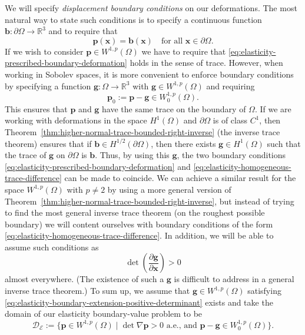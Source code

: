We will specify \emph{displacement boundary conditions} on our deformations. The most natural way to state such conditions is to specify a continuous function $\bm{b}:\partial\Omega\to\mathbb{R}^3$ and to require that
\begin{equation}\label{eq:elasticity-prescribed-boundary-deformation}
\bm{p}(\bm{x})=\bm{b}(\bm{x})\quad\text{for all }\bm{x}\in\partial\Omega.
\end{equation}
If we wish to consider $\bm{p}\in W^{1,p}(\Omega)$ we have to require that \eqref{eq:elasticity-prescribed-boundary-deformation} holds in the sense of trace. However, when working in Sobolev spaces, it is more convenient to enforce boundary conditions by specifying a function $\bm{g}:\Omega\to\mathbb{R}^3$ with $\bm{g}\in W^{1,p}(\Omega)$ and requiring
\begin{equation}\label{eq:elasticity-homogeneous-trace-difference}
\bm{p}_0:=\bm{p}-\bm{g}\in W_0^{1,p}(\Omega).
\end{equation}
This ensures that $\bm{p}$ and $\bm{g}$ have the same trace on the boundary of $\Omega$. If we are working with deformations in the space $H^1(\Omega)$ and $\partial\Omega$ is of class $C^1$, then Theorem~\ref{thm:higher-normal-trace-bounded-right-inverse} (the inverse trace theorem) ensures that if $\bm{b}\in H^{1/2}(\partial\Omega)$, then there exists $\bm{g}\in H^1(\Omega)$ such that the trace of $\bm{g}$ on $\partial\Omega$ is $\bm{b}$. Thus, by using this $\bm{g}$, the two boundary conditions \eqref{eq:elasticity-prescribed-boundary-deformation} and \eqref{eq:elasticity-homogeneous-trace-difference} can be made to coincide. We can achieve a similar result for the space $W^{1,p}(\Omega)$ with $p\neq2$ by using a more general version of Theorem~\ref{thm:higher-normal-trace-bounded-right-inverse}, but instead of trying to find the most general inverse trace theorem (on the roughest possible boundary) we will content ourselves with boundary conditions of the form \eqref{eq:elasticity-homogeneous-trace-difference}. In addition, we will be able to assume such conditions as
\begin{equation}\label{eq:elasticity-boundary-extension-positive-determinant}
\det\left(\dfrac{\partial\bm{g}}{\partial\bm{x}}\right)>0
\end{equation}
almost everywhere. (The existence of such a $\bm{g}$ is difficult to address in a general inverse trace theorem.) To sum up, we assume that $\bm{g}\in W^{1,p}(\Omega)$ satisfying \eqref{eq:elasticity-boundary-extension-positive-determinant} exists and take the domain of our elasticity boundary-value problem to be
\begin{equation}\label{eq:elasticity-admissible-deformation-domain}
\mathcal{D}_{\mathcal{E}}:=\{\bm{p}\in W^{1,p}(\Omega)\mid\det\nabla\bm{p}>0\text{ a.e., and }\bm{p}-\bm{g}\in W_0^{1,p}(\Omega)\}.
\end{equation}

